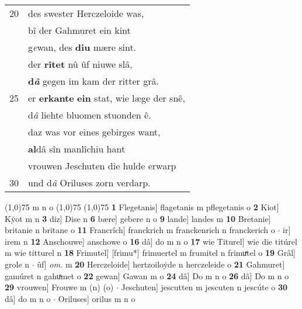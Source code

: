 \documentclass[8pt,a4paper,notitlepage]{article}
\begin{document}
\begin{table}[ht]
\begin{minipage}[t]{0.5\linewidth}
\begin{tabular}{rl}
20 & des swester Herczeloide was,\\ 
 & bî der Gahmuret ein kint\\ 
 & g\textit{e}wan, des \textbf{diu} mære sint.\\ 
 & der \textbf{rîtet} nû ûf niuwe slâ,\\ 
 & \textbf{d\textit{â}} gegen im kam der ritter grâ.\\ 
25 & er \textbf{erkante} \textbf{ein} stat, wie læge der snê,\\ 
 & d\textit{â} liehte bluomen stuonden ê.\\ 
 & daz was vor eines gebirges want,\\ 
 & \textbf{al}dâ sîn manlîchiu hant\\ 
 & vrouwen Jeschuten die hulde erwarp\\ 
30 & und d\textit{â} Oriluses zorn verdarp.\\ 
\end{tabular}
\scriptsize
\line(1,0){75} \newline
m n o \newline
\line(1,0){75} \newline
\newline
\line(1,0){75} \newline
\textbf{1} Flegetanis] flagetanis m pflegetanis o \textbf{2} Kiot] Kẏot m n \textbf{3} diz] Dise n \textbf{6} bære] gebere n o \textbf{9} lande] landes m \textbf{10} Bretanie] britanie n britane o \textbf{11} Francrîch] franckrich m franckenrich n franckerich o  $\cdot$ ir] irem n \textbf{12} Anschouwe] anschowe o \textbf{16} dâ] do m n o \textbf{17} wie Titurel] wie die titúrel m wie titturel n \textbf{18} Frimutel] [frimu*] frimuertel m frumitel n frimuͯtel o \textbf{19} Grâl] grole n  $\cdot$ ûf] \textit{om.} m \textbf{20} Herczeloide] hertzoiloẏde n herczeleide o \textbf{21} Gahmuret] gamúret n gahuͯmet o \textbf{22} gewan] Gawan m o \textbf{24} dâ] Do m n o \textbf{26} dâ] Do m n o \textbf{29} vrouwen] Frouwe m (n) (o)  $\cdot$ Jeschuten] jescutten m jescuten n jescúte o \textbf{30} dâ] do m n o  $\cdot$ Oriluses] orilus m n o \newline
\end{minipage}
\end{table}
\newpage
\end{document}
